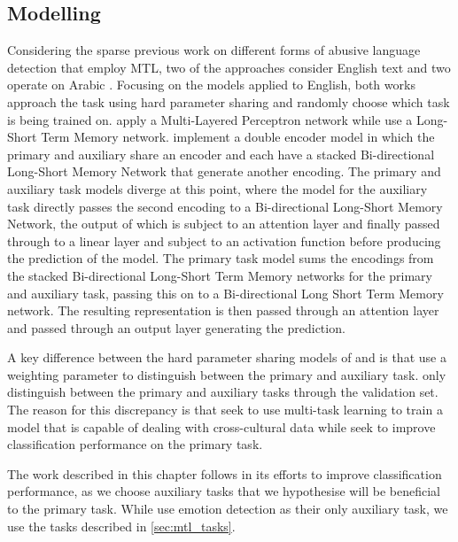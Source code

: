 \subsection{Modelling}
Considering the sparse previous work on different forms of abusive language detection that employ MTL, two of the approaches consider English text \cite{Waseem:2018,Rajamanickam:2020} and two operate on Arabic \cite{Farha:2020,Djandji:2019}.
Focusing on the models applied to English, both works approach the task using hard parameter sharing \cite{Caruana:1997} and randomly choose which task is being trained on.
\citet{Waseem:2018} apply a Multi-Layered Perceptron network while \citet{Rajamanickam:2020} use a Long-Short Term Memory network. 
\citet{Rajamanickam:2020} implement a double encoder model in which the primary and auxiliary share an encoder and each have a stacked Bi-directional Long-Short Memory Network that generate another encoding.
The primary and auxiliary task models diverge at this point, where the model for the auxiliary task directly passes the second encoding to a Bi-directional Long-Short Memory Network, the output of which is subject to an attention layer and finally passed through to a linear layer and subject to an activation function before producing the prediction of the model.
The primary task model sums the encodings from the stacked Bi-directional Long-Short Term Memory networks for the primary and auxiliary task, passing this on to a Bi-directional Long Short Term Memory network.
The resulting representation is then passed through an attention layer and passed through an output layer generating the prediction.

A key difference between the hard parameter sharing models of \citet{Waseem:2018} and \citet{Rajamanickam:2020} is that \citet{Rajamanickam:2020} use a weighting parameter to distinguish between the primary and auxiliary task. \citet{Waseem:2018} only distinguish between the primary and auxiliary tasks through the validation set. The reason for this discrepancy is that \citet{Waseem:2018} seek to use multi-task learning to train a model that is capable of dealing with cross-cultural data while \citet{Rajamanickam:2020} seek to improve classification performance on the primary task.

The work described in this chapter follows \citet{Rajamanickam:2020} in its efforts to improve classification performance, as we choose auxiliary tasks that we hypothesise will be beneficial to the primary task. While \citet{Rajamanickam:2020} use emotion detection as their only auxiliary task, we use the tasks described in \autoref{sec:mtl_tasks}.

